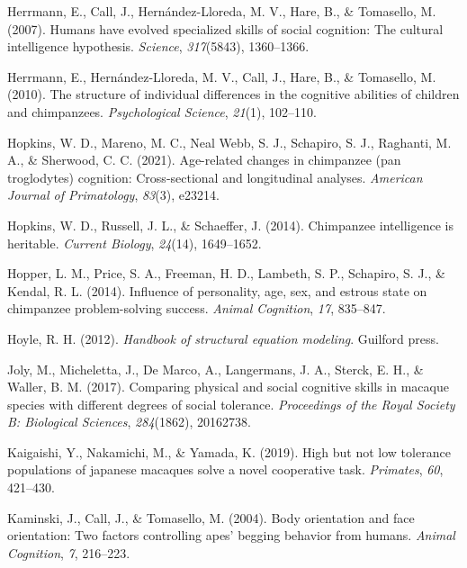\documentclass[
  man,floatsintext]{apa6}
\newlength{\cslhangindent}
\newlength{\cslentryspacingunit} %
\newenvironment{CSLReferences}[2] %
 {%
  \setlength{\parindent}{0pt}
  \ifodd #1
  \let\oldpar\par
  \def\par{\hangindent=\cslhangindent\oldpar}
  \fi
  \setlength{\parskip}{#2\cslentryspacingunit}
 }%
 {}
\begin{document}
\begin{CSLReferences}{1}{0}
\leavevmode{}%
Herrmann, E., Call, J., Hernández-Lloreda, M. V., Hare, B., \& Tomasello, M. (2007). Humans have evolved specialized skills of social cognition: The cultural intelligence hypothesis. \emph{Science}, \emph{317}(5843), 1360--1366.

\leavevmode{}%
Herrmann, E., Hernández-Lloreda, M. V., Call, J., Hare, B., \& Tomasello, M. (2010). The structure of individual differences in the cognitive abilities of children and chimpanzees. \emph{Psychological Science}, \emph{21}(1), 102--110.

\leavevmode{}%
Hopkins, W. D., Mareno, M. C., Neal Webb, S. J., Schapiro, S. J., Raghanti, M. A., \& Sherwood, C. C. (2021). Age-related changes in chimpanzee (pan troglodytes) cognition: Cross-sectional and longitudinal analyses. \emph{American Journal of Primatology}, \emph{83}(3), e23214.

\leavevmode{}%
Hopkins, W. D., Russell, J. L., \& Schaeffer, J. (2014). Chimpanzee intelligence is heritable. \emph{Current Biology}, \emph{24}(14), 1649--1652.

\leavevmode{}%
Hopper, L. M., Price, S. A., Freeman, H. D., Lambeth, S. P., Schapiro, S. J., \& Kendal, R. L. (2014). Influence of personality, age, sex, and estrous state on chimpanzee problem-solving success. \emph{Animal Cognition}, \emph{17}, 835--847.

\leavevmode{}%
Hoyle, R. H. (2012). \emph{Handbook of structural equation modeling}. Guilford press.

\leavevmode{}%
Joly, M., Micheletta, J., De Marco, A., Langermans, J. A., Sterck, E. H., \& Waller, B. M. (2017). Comparing physical and social cognitive skills in macaque species with different degrees of social tolerance. \emph{Proceedings of the Royal Society B: Biological Sciences}, \emph{284}(1862), 20162738.

\leavevmode{}%
Kaigaishi, Y., Nakamichi, M., \& Yamada, K. (2019). High but not low tolerance populations of japanese macaques solve a novel cooperative task. \emph{Primates}, \emph{60}, 421--430.

\leavevmode{}%
Kaminski, J., Call, J., \& Tomasello, M. (2004). Body orientation and face orientation: Two factors controlling apes' begging behavior from humans. \emph{Animal Cognition}, \emph{7}, 216--223.


\end{CSLReferences}
\end{document}
